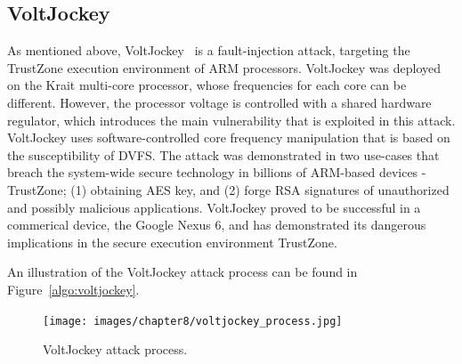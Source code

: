\subsection{VoltJockey}
As mentioned above, VoltJockey~\cite{qiu2019voltjockey} is a fault-injection attack, targeting the TrustZone execution environment of ARM processors.
VoltJockey was deployed on the Krait multi-core processor, whose frequencies for each core can be different.
However, the processor voltage is controlled with a shared hardware regulator, which introduces the main vulnerability that is exploited in this attack.
VoltJockey uses software-controlled core frequency manipulation that is based on the susceptibility of DVFS.
The attack was demonstrated in two use-cases that breach the system-wide secure technology in billions of ARM-based devices - TrustZone; (1) obtaining AES key, and (2) forge RSA signatures of unauthorized and possibly malicious applications.
VoltJockey proved to be successful in a commerical device, the Google Nexus 6, and has demonstrated its dangerous implications in the secure execution environment TrustZone.

An illustration of the VoltJockey attack process can be found in Figure~\ref{algo:voltjockey}.

\begin{figure}[!ht]
	\centering
	\texttt{[image: images/chapter8/voltjockey\_process.jpg]}
	\caption{VoltJockey attack process.}
	\label{fig:voltjockey}
\end{figure}